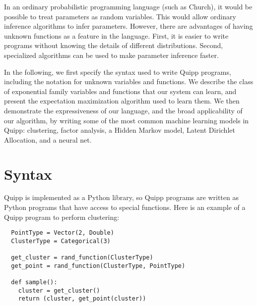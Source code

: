 \documentclass[proceed]{article}
\begin{document}

  In an ordinary probabilistic programming language (such as Church),
  it would be possible to treat parameters as random variables.  This
  would allow ordinary inference algorithms to infer parameters.  However,
  there are advantages of having unknown functions as a feature
  in the language.
  First, it is easier to
  write programs without knowing the details of different distributions.
  Second, specialized algorithms can be used to make parameter inference
  faster.



  In the following, we first specify the syntax used to write Quipp programs,
  including the notation for unknown variables and functions.
  We describe the class of exponential family variables and functions that our system can learn,
  and present the expectation maximization algorithm used to learn them.
  We then demonstrate the expressiveness of our language, and the broad
  applicability of our algorithm, by writing some of the most common machine learning models
  in Quipp: clustering, factor analysis, a Hidden Markov model, Latent Dirichlet Allocation, and
  a neural net.
  
  \section{Syntax}

  Quipp is implemented as a Python library, so Quipp programs are written as Python programs that have access
  to special functions.  Here is an example of a Quipp program to perform clustering:


  \begin{verbatim}
  PointType = Vector(2, Double)
  ClusterType = Categorical(3)

  get_cluster = rand_function(ClusterType)
  get_point = rand_function(ClusterType, PointType)

  def sample():
    cluster = get_cluster()
    return (cluster, get_point(cluster))
  \end{verbatim}
\end{document}
